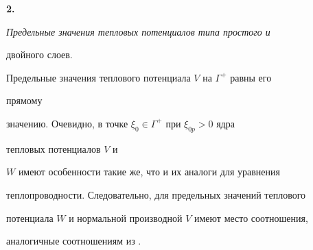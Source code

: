 {\bf 2.} {\it Предельные значения тепловых потенциалов типа простого и 


двойного слоев.} 


Предельные значения теплового потенциала $V$ на $\Gamma^+$ равны его 


прямому 


значению. Очевидно, в точке $\xi_0\in\Gamma^+$ при $\xi_{0p}>0$ ядра 


тепловых потенциалов $V$ и 


$W$ имеют особенности такие же, что и их аналоги для уравнения 


теплопроводности. Следовательно, для предельных значений теплового 


потенциала $W$ и нормальной производной $V$ имеют место соотношения, 


аналогичные соотношениям из \cite{4}. 


 


